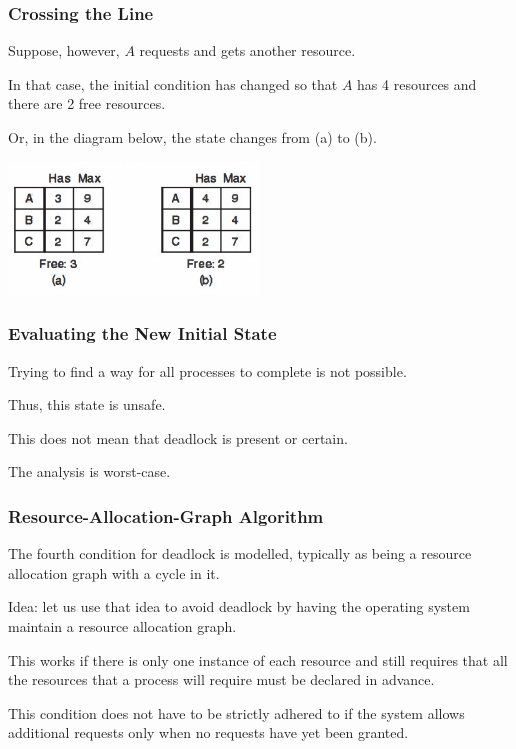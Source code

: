 \begin{frame}
\frametitle{Crossing the Line}

Suppose, however, $A$ requests and gets another resource. 

In that case, the initial condition has changed so that $A$ has 4 resources and there are 2 free resources. 

Or, in the diagram below, the state changes from (a) to (b).

\begin{center}
\includegraphics[width=0.5\textwidth]{images/unsafe-state-initial.png}
\end{center}


\end{frame}

\begin{frame}
\frametitle{Evaluating the New Initial State}

Trying to find a way for all processes to complete is not possible.

Thus, this state is unsafe.

This does not mean that deadlock is present or certain. 

The analysis is worst-case.

\end{frame}

\begin{frame}
\frametitle{Resource-Allocation-Graph Algorithm}

The fourth condition for deadlock is modelled, typically as being a resource allocation graph with a cycle in it. 

Idea: let us use that idea to avoid deadlock by having the operating system maintain a resource allocation graph. 

This works if there is only one instance of each resource and still requires that all the resources that a process will require must be declared in advance. 

This condition does not have to be strictly adhered to if the system allows additional requests only when no requests have yet been granted.

\end{frame}

